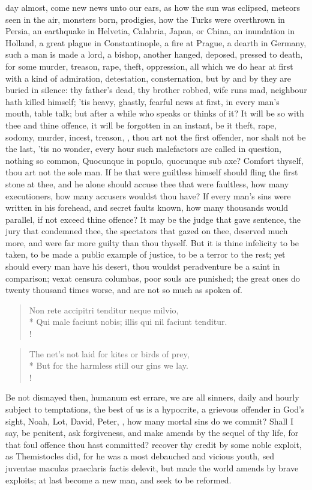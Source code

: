{day almost, come new news unto our ears, as how the sun was eclipsed,
meteors seen in the air, monsters born, prodigies, how the Turks were
overthrown in Persia, an earthquake in Helvetia, Calabria, Japan, or
China, an inundation in Holland, a great plague in Constantinople, a
fire at Prague, a dearth in Germany, such a man is made a lord, a
bishop, another hanged, deposed, pressed to death, for some murder,
treason, rape, theft, oppression, all which we do hear at first with a
kind of admiration, detestation, consternation, but by and by they are
buried in silence: thy father's dead, thy brother robbed, wife runs
mad, neighbour hath killed himself; 'tis heavy, ghastly, fearful news
at first, in every man's mouth, table talk; but after a while who
speaks or thinks of it? It will be so with thee and thine offence, it
will be forgotten in an instant, be it theft, rape, sodomy, murder,
incest, treason, \etc{}, thou art not the first offender, nor shalt not be
the last, 'tis no wonder, every hour such malefactors are called in
question, nothing so common, Quocunque in populo, quocunque sub axe?
Comfort thyself, thou art not the sole man. If he that were
guiltless himself should fling the first stone at thee, and he alone
should accuse thee that were faultless, how many executioners, how many
accusers wouldst thou have? If every man's sins were written in his
forehead, and secret faults known, how many thousands would parallel,
if not exceed thine offence? It may be the judge that gave sentence,
the jury that condemned thee, the spectators that gazed on thee,
deserved much more, and were far more guilty than thou thyself. But it
is thine infelicity to be taken, to be made a public example of
justice, to be a terror to the rest; yet should every man have his
desert, thou wouldst peradventure be a saint in comparison; vexat
censura columbas, poor souls are punished; the great ones do twenty
thousand times worse, and are not so much as spoken of.
%
\begin{latin}%
\begin{verse}%
Non rete accipitri tenditur neque milvio,\\*
Qui male faciunt nobis; illis qui nil faciunt tenditur.\\!
\end{verse}%
\end{latin}%
\translationrule%
\begin{verse}%
The net's not laid for kites or birds of prey,\\*
But for the harmless still our gins we lay.\\!
\end{verse}
%
Be not dismayed then, humanum est errare, we are all sinners, daily and
hourly subject to temptations, the best of us is a hypocrite, a
grievous offender in God's sight, Noah, Lot, David, Peter, \etc{}, how
many mortal sins do we commit? Shall I say, be penitent, ask
forgiveness, and make amends by the sequel of thy life, for that foul
offence thou hast committed? recover thy credit by some noble exploit,
as Themistocles did, for he was a most debauched and vicious youth, sed
juventae maculas praeclaris factis delevit, but made the world amends
by brave exploits; at last become a new man, and seek to be reformed.

}
